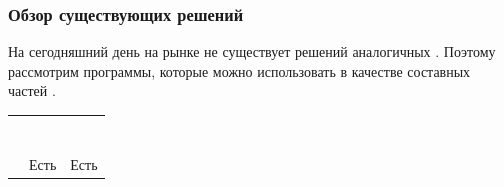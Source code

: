 \begin{frame}
\frametitle{Обзор существующих решений}

На сегодняшний день на рынке не существует решений аналогичных {\ProgModule}.
Поэтому рассмотрим программы, которые можно использовать в качестве составных частей
{\ProgModule}.
\begin{table}[!htbp]
    {\small
        \setlength{\tabcolsep}{2pt}
        \caption{\label{table:dynamic-analyzers-comparsion}
               Сравнительная таблица программ для динамического анализа}
        \begin{longtable}{*{3}{| c}|}
            \hline
             &
                                 &
                               \\
            \hline
                         &  &  \\
            \hline
                    &  &  \\
            \hline
             &  &  \\
            \hline
             &  &  \\
            \hline
                           &  &    \\
            \hline
                                       &  &    \\
            \hline
                                  &  &  \\
            \hline
                         & Есть & Есть \\
            \hline
        \end{longtable}
    }
\end{table}
\end{frame}

